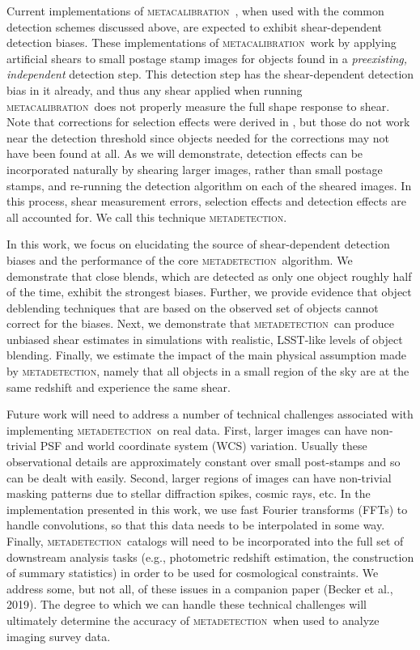 \documentclass[fleqn,useAMS,usenatbib]{mnras}
\newcommand{\mcal}{\textsc{metacalibration}}
\newcommand{\mdet}{\textsc{metadetection}}
\begin{document}
Current implementations of \mcal\ \citep[e.g.,][]{HuffMcal2017,SheldonMcal2017},
when used with the common detection schemes discussed above, are expected to exhibit shear-dependent
detection biases. These implementations of \mcal\ work by applying artificial
shears to small postage stamp images for objects found in a {\em preexisting, independent}
detection step. This detection step has the shear-dependent detection bias in it already,
and thus any shear applied when running \mcal\ does not properly measure the full shape response
to shear. Note that corrections for selection effects were derived in
\cite{SheldonMcal2017}, but those do not work near the detection threshold since objects
needed for the corrections may not have been found at all. As we will
demonstrate, detection effects can be incorporated naturally by shearing larger
images, rather than small postage stamps, and re-running the detection algorithm on
each of the sheared images. In this process, shear measurement errors,
selection effects and detection effects are all accounted for. We call this technique
\mdet.

In this work, we focus on elucidating the source of shear-dependent detection
biases and the performance of the core \mdet\ algorithm. We demonstrate that
close blends, which are detected as only one object roughly half of the time,
exhibit the strongest biases. Further, we provide evidence that object
deblending techniques that are based on the observed set of objects cannot
correct for the biases. Next, we demonstrate that \mdet\ can produce unbiased
shear estimates in simulations with realistic, LSST-like levels of object
blending. Finally, we estimate the impact of the main physical assumption
made by \mdet, namely that all objects in a small region of the sky are at the
same redshift and experience the same shear.

Future work will need to address a number of technical challenges associated
with implementing \mdet\ on real data. First, larger images can have non-trivial
PSF and world coordinate system (WCS) variation. Usually these observational details
are approximately constant over small post-stamps and so can be dealt with easily.
Second, larger regions of images can have non-trivial masking patterns due to
stellar diffraction spikes, cosmic rays, etc. In the implementation presented in
this work, we use fast Fourier transforms (FFTs) to handle convolutions, so that
this data needs to be interpolated in some way. Finally, \mdet\ catalogs will
need to be incorporated into the full set of downstream analysis tasks (e.g.,
photometric redshift estimation, the construction of summary statistics) in
order to be used for cosmological constraints. We address some, but not all, of
these issues in a companion paper (Becker et al., 2019). The degree to which we can
handle these technical challenges will ultimately determine the accuracy of
\mdet\ when used to analyze imaging survey data.
\end{document}
